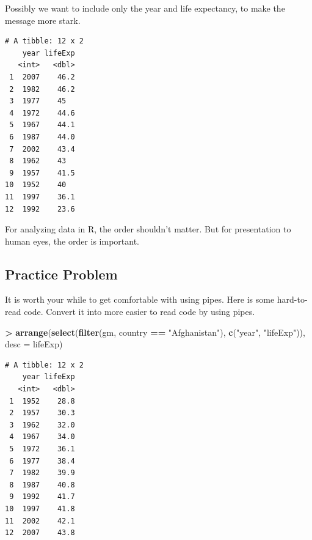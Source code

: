 \documentclass[]{krantz}
\makeatletter
\newenvironment{Shaded}{\begin{snugshade}}{\end{snugshade}}
\newcommand{\KeywordTok}[1]{\textcolor[rgb]{0.27,0.27,0.27}{\textbf{#1}}}
\newcommand{\DataTypeTok}[1]{\textcolor[rgb]{0.27,0.27,0.27}{#1}}
\newcommand{\StringTok}[1]{\textcolor[rgb]{0.5,0.5,0.5}{#1}}
\newcommand{\OperatorTok}[1]{\textcolor[rgb]{0.43,0.43,0.43}{\textbf{#1}}}
\newcommand{\NormalTok}[1]{#1}
\newenvironment{kframe}{%
\medskip{}
\setlength{\fboxsep}{.8em}
 \def\at@end@of@kframe{}%
 \ifinner\ifhmode%
  \def\at@end@of@kframe{\end{minipage}}%
  \begin{minipage}{\columnwidth}%
 \fi\fi%
 \def\FrameCommand##1{\hskip\@totalleftmargin \hskip-\fboxsep
 \colorbox{shadecolor}{##1}\hskip-\fboxsep
     \hskip-\linewidth \hskip-\@totalleftmargin \hskip\columnwidth}%
 \MakeFramed {\advance\hsize-\width
   \@totalleftmargin\z@ \linewidth\hsize
   \@setminipage}}%
 {\par\unskip\endMakeFramed%
 \at@end@of@kframe}
\renewenvironment{Shaded}{\begin{kframe}}{\end{kframe}}
\makeatother
\begin{document}
Possibly we want to include only the year and life expectancy, to make
the message more stark.

\begin{Shaded}
\end{Shaded}

\begin{verbatim}
# A tibble: 12 x 2
    year lifeExp
   <int>   <dbl>
 1  2007    46.2
 2  1982    46.2
 3  1977    45  
 4  1972    44.6
 5  1967    44.1
 6  1987    44.0
 7  2002    43.4
 8  1962    43  
 9  1957    41.5
10  1952    40  
11  1997    36.1
12  1992    23.6
\end{verbatim}

For analyzing data in R, the order shouldn't matter. But for
presentation to human eyes, the order is important.

\subsection{Practice Problem}\label{practice-problem-9}

It is worth your while to get comfortable with using pipes. Here is some
hard-to-read code. Convert it into more easier to read code by using
pipes.

\begin{Shaded}
\begin{Highlighting}[]
\OperatorTok{>}\StringTok{ }\KeywordTok{arrange}\NormalTok{(}\KeywordTok{select}\NormalTok{(}\KeywordTok{filter}\NormalTok{(gm, country }\OperatorTok{==}\StringTok{ "Afghanistan"}\NormalTok{), }\KeywordTok{c}\NormalTok{(}\StringTok{"year"}\NormalTok{, }\StringTok{"lifeExp"}\NormalTok{)), }\DataTypeTok{desc =}\NormalTok{ lifeExp)}
\end{Highlighting}
\end{Shaded}

\begin{verbatim}
# A tibble: 12 x 2
    year lifeExp
   <int>   <dbl>
 1  1952    28.8
 2  1957    30.3
 3  1962    32.0
 4  1967    34.0
 5  1972    36.1
 6  1977    38.4
 7  1982    39.9
 8  1987    40.8
 9  1992    41.7
10  1997    41.8
11  2002    42.1
12  2007    43.8
\end{verbatim}
\end{document}
